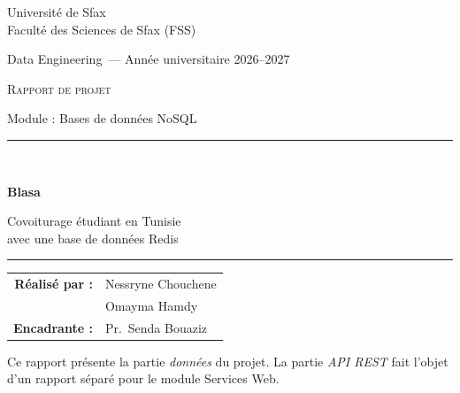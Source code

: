 \documentclass[11pt,a4paper]{article}
\newcommand{\auteurA}{Nessryne Chouchene}          %
\newcommand{\auteurB}{Omayma Hamdy}          %
\newcommand{\niveau}{Data Engineering}
\newcommand{\annee}{2026--2027}
\newcommand{\encadrante}{Pr.\ Senda Bouaziz}
\begin{document}
\begin{titlepage}
\centering
{\large Universit\'e de Sfax\\[2pt] Facult\'e des Sciences de Sfax (FSS)\par}
\vspace{0.6cm}
{\normalsize \niveau\ --- Ann\'ee universitaire \annee\par}
\vspace{2.2cm}
{\large\scshape Rapport de projet\par}
{\large Module : Bases de donn\'ees NoSQL\par}
\vspace{1cm}
\rule{\textwidth}{1.2pt}\\[0.5cm]
{\Huge\bfseries\color{brand} Blasa\par}
\vspace{0.3cm}
{\Large Covoiturage \'etudiant en Tunisie\\ avec une base de donn\'ees Redis\par}
\rule{\textwidth}{1.2pt}
\vspace{2.2cm}

\begin{tabular}{rl}
\textbf{R\'ealis\'e par :} & \auteurA \\ & \auteurB \\[6pt]
\textbf{Encadrante :} & \encadrante
\end{tabular}

\vfill
{\small Ce rapport pr\'esente la partie \emph{donn\'ees} du projet. La partie \emph{API REST} fait l'objet d'un rapport s\'epar\'e pour le module Services Web.}
\end{titlepage}

\begin{abstract}
\noindent Blasa est une application de covoiturage destin\'ee aux \'etudiants tunisiens : un conducteur propose des places sur un trajet, un passager cherche un trajet pr\`es de lui ou entre deux villes, r\'eserve une place puis note son conducteur. Ce rapport d\'ecrit la base de donn\'ees de l'application, r\'ealis\'ee avec \textbf{Redis}, une base \textbf{cl\'e-valeur} en m\'emoire. Nous expliquons pourquoi ce choix r\'epond aux besoins (recherche g\'eographique, index par ville, compteurs atomiques, expiration automatique, classement), comment les donn\'ees sont mod\'elis\'ees avec les structures \texttt{HASH}, \texttt{SET}, \texttt{ZSET} et \texttt{GEO}, quelles requ\^etes sont utilis\'ees, et quelles sont les limites de l'approche.

\medskip
\noindent\textbf{Mots-cl\'es :} NoSQL, Redis, cl\'e-valeur, mod\'elisation, g\'eolocalisation, TTL, atomicit\'e, covoiturage.
\end{abstract}
\end{document}

